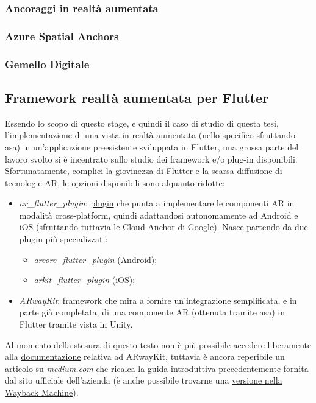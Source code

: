 \subsubsection{Ancoraggi in realtà aumentata}
\subsubsection{Azure Spatial Anchors}
\subsubsection{Gemello Digitale}

\subsection{Framework realtà aumentata per Flutter}
Essendo lo scopo di questo stage, e quindi il caso di studio di questa tesi, l'implementazione di una vista in realtà aumentata (nello specifico sfruttando asa) in un'applicazione preesistente sviluppata in Flutter, una grossa parte del lavoro svolto si è incentrato sullo studio dei framework e/o plug-in disponibili.\\
Sfortunatamente, complici la giovinezza di Flutter e la scarsa diffusione di tecnologie AR, le opzioni disponibili sono alquanto ridotte:
\begin{itemize}
    \item \textit{ar\_flutter\_plugin}: \href{https://pub.dev/packages/ar_flutter_plugin}{plugin} che punta a implementare le componenti AR in modalità cross-platform, quindi adattandosi autonomamente ad Android e iOS (sfruttando tuttavia le Cloud Anchor di Google). Nasce partendo da due plugin più specializzati: 
    \begin{itemize}
        \item \textit{arcore\_flutter\_plugin} (\href{https://github.com/giandifra/arcore_flutter_plugin}{Android});
        \item \textit{arkit\_flutter\_plugin} (\href{https://github.com/olexale/arkit_flutter_plugin}{iOS});
    \end{itemize}
    \item \textit{ARwayKit}: framework che mira a fornire un'integrazione semplificata, e in parte già completata, di una componente AR (ottenuta tramite asa) in Flutter tramite vista in Unity.
\end{itemize}
{\footnotesize Al momento della stesura di questo testo non è più possibile accedere liberamente alla \href{https://app.gitbook.com/s/-MCtct_TY9f3e8PrcV9T/arwaykit-with-flutter/quickstart-in-flutter}{documentazione} relativa ad ARwayKit, tuttavia è ancora reperibile un \href{https://medium.com/arway/building-ar-navigation-apps-with-flutter-and-arwaykit-280b69401cd9}{articolo} su \textit{medium.com} che ricalca la guida introduttiva precedentemente fornita dal sito ufficiale dell'azienda (è anche possibile trovarne una \href{https://web.archive.org/web/20220525060655/https://docs.arway.app/arwaykit-with-flutter/quickstart-in-flutter}{versione nella Wayback Machine}).}

